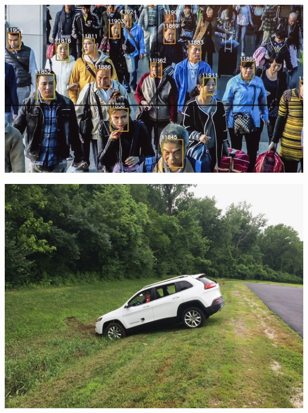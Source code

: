 \documentclass[french,handout]{beamer}
\begin{document}
\begin{frame}
   \begin{center}
\includegraphics[height=.8\textheight]{./faces.jpeg}
\end{center}
\end{frame}






\begin{frame}
   \begin{center}
\includegraphics[height=.8\textheight]{jeep.jpg}
\end{center}
\end{frame}



\end{document}
